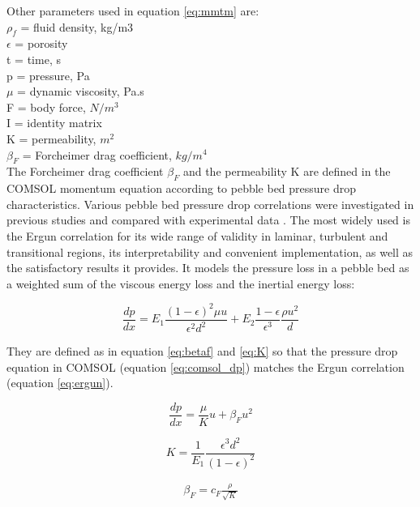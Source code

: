 \documentclass{elsarticle}
\begin{document}
Other parameters used in equation \ref{eq:mmtm} are:\\
$\rho_f$ = fluid density, kg/m3\\
$\epsilon$ = porosity\\
t = time, s\\
p = pressure, Pa\\
$\mu$ = dynamic viscosity, Pa.s\\
F = body force, $N/m^3$\\
I = identity matrix\\
K = permeability, $m^2$\\
$\beta_F$ = Forcheimer drag coefficient, $kg/m^4$\\

The Forcheimer drag coefficient $\beta_F$ and the permeability K are defined in the COMSOL momentum equation according to pebble bed pressure drop characteristics. 
Various pebble bed pressure drop correlations were investigated in previous studies \cite{Scarlat2012} and compared with experimental data \cite{Kang2010}. The most widely used is the Ergun correlation \cite{Ergun1949} for its wide range of validity in laminar, turbulent and transitional regions, its interpretability and convenient implementation, as well as the satisfactory results it provides. It models the pressure loss in a pebble bed as a weighted sum of the viscous energy loss and the inertial energy loss: 


\begin{equation}
  \frac{dp}{dx} = E_1 \frac{(1-\epsilon)^2\mu u}{\epsilon ^2 d^2} + E_2 \frac{1-\epsilon}{\epsilon^3}\frac{\rho u^2}{d}
  \label{eq:ergun}
\end{equation}



They are defined as in equation \ref{eq:betaf} and \ref{eq:K} so that the pressure drop equation in COMSOL (equation \ref{eq:comsol_dp}) matches the Ergun correlation (equation \ref{eq:ergun}).

\begin{equation}
  \frac{dp}{dx} = \frac{\mu}{K}u + \beta_F u^2
  \label{eq:comsol_dp}
\end{equation}

\begin{equation}
      K = \frac{1}{E_1}\frac{\epsilon^3 d^2}{(1-\epsilon)^2}
      \label{eq:K}
\end{equation}

\begin{align}
  \beta_F = c_F \frac{\rho}{\sqrt{K}}
  \label{eq:betaf}
\end{align}
\end{document}
